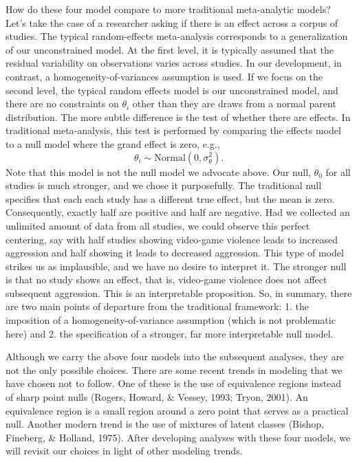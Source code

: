 \documentclass[english,man]{apa6}
\theoremstyle{definition}
\theoremstyle{definition}
\theoremstyle{definition}
\theoremstyle{remark}
\begin{document}
How do these four model compare to more traditional meta-analytic
models? Let's take the case of a researcher asking if there is an effect
across a corpus of studies. The typical random-effects meta-analysis
corresponds to a generalization of our unconstrained model. At the first
level, it is typically assumed that the residual variability on
observations varies across studies. In our development, in contrast, a
homogeneity-of-variances assumption is used. If we focus on the second
level, the typical random effects model is our unconstrained model, and
there are no constraints on \(\theta_i\) other than they are draws from
a normal parent distribution. The more subtle difference is the test of
whether there are effects. In traditional meta-analysis, this test is
performed by comparing the effects model to a null model where the grand
effect is zero, e.g., \[
\theta_i \sim \mbox{Normal}(0,\sigma^2_\theta).
\] Note that this model is not the null model we advocate above. Our
null, \(\theta_0\) for all studies is much stronger, and we chose it
purposefully. The traditional null specifies that each each study has a
different true effect, but the mean is zero. Consequently, exactly half
are positive and half are negative. Had we collected an unlimited amount
of data from all studies, we could observe this perfect centering, say
with half studies showing video-game violence leads to increased
aggression and half showing it leads to decreased aggression. This type
of model strikes us as implausible, and we have no desire to interpret
it. The stronger null is that no study shows an effect, that is,
video-game violence does not affect subsequent aggression. This is an
interpretable proposition. So, in summary, there are two main points of
departure from the traditional framework: 1. the imposition of a
homogeneity-of-variance assumption (which is not problematic here) and
2. the specification of a stronger, far more interpretable null model.

Although we carry the above four models into the subsequent analyses,
they are not the only possible choices. There are some recent trends in
modeling that we have chosen not to follow. One of these is the use of
equivalence regions instead of sharp point nulls (Rogers, Howard, \&
Vessey, 1993; Tryon, 2001). An equivalence region is a small region
around a zero point that serves as a practical null. Another modern
trend is the use of mixtures of latent classes (Bishop, Fineberg, \&
Holland, 1975). After developing analyses with these four models, we
will revisit our choices in light of other modeling trends.
\end{document}
